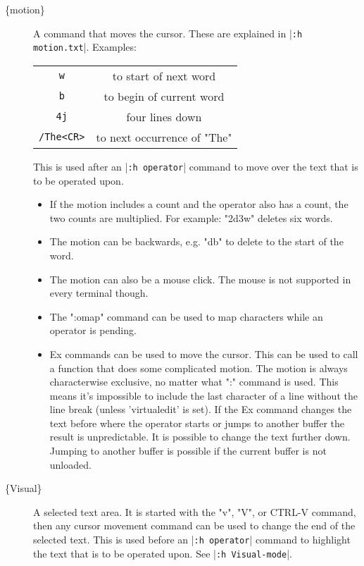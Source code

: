 \begin{description}
				\item[\{motion\}]
								\label{{motion}}
								\label{movement}
								A command that moves the cursor.
								These are explained in |\verb!:h motion.txt!|.
								Examples:
								\begin{center}
												\begin{tabular}{c c}
																\verb!w! & to start of next word\\
																\verb!b! & to begin of current word\\
																\verb!4j! & four lines down\\
												\verb!/The<CR>! & to next occurrence of "The"\\
												\end{tabular}
								\end{center}
								This is used after an |\verb!:h operator!| command to move over the text that is to be operated upon.
								\begin{itemize}
												\item If the motion includes a count and the operator also has a count, the two counts are multiplied.
																For example: "2d3w" deletes six words.
												\item The motion can be backwards, e.g. "db" to delete to the start of the word.
												\item The motion can also be a mouse click.
																The mouse is not supported in every terminal though.
												\item The ":omap" command can be used to map characters while an operator is pending.
												\item Ex commands can be used to move the cursor.
																This can be used to call a function that does some complicated motion.
																The motion is always characterwise exclusive, no matter what ":" command is used.
																This means it's impossible to include the last character of a line without the line break (unless 'virtualedit' is set).
																If the Ex command changes the text before where the operator starts or jumps to another buffer the result is unpredictable.
																It is possible to change the text further down.
																Jumping to another buffer is possible if the current buffer is not unloaded.
								\end{itemize}

				\item[\{Visual\}]
								\label{{Visual}}
								A selected text area.
								It is started with the "v", "V", or CTRL-V command, then any cursor movement command can be used to change the end of the selected text.
								This is used before an |\verb!:h operator!| command to highlight the text that is to be operated upon.
								See |\verb!:h Visual-mode!|.


\end{description}
